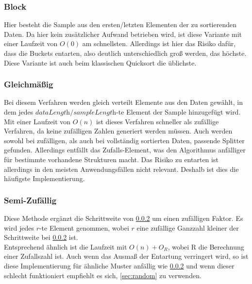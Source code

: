 		\subsubsection{Block}
			\label{sec:block}
			
			Hier besteht die Sample aus den ersten/letzten Elementen der zu sortierenden Daten.
			Da hier kein zusätzlicher Aufwand betrieben wird, ist diese Variante mit einer Laufzeit von $O(0)$ am schnellsten.
			Allerdings ist hier das Risiko dafür, dass die Buckets entarten, also deutlich unterschiedlich groß werden, das höchste.
			Diese Variante ist auch beim klassischen Quicksort die üblichste.

		\subsubsection{Gleichmäßig}
			\label{sec:even}
			
			Bei diesem Verfahren werden gleich verteilt Elemente aus den Daten gewählt, in dem jedes $\textit{dataLength}/\textit{sampleLength}$-te Element der Sample hinzugefügt wird.\\
			Mit einer Laufzeit von $O(n)$ ist dieses Verfahren schneller als zufällige Verfahren, da keine zufälligen Zahlen generiert werden müssen.
			Auch werden sowohl bei zufälligen, als auch bei vollständig sortierten Daten, passende Splitter gefunden.
			Allerdings entfällt das Zufalls-Element, was den Algorithmus anfälliger für bestimmte vorhandene Strukturen macht.
			Das Risiko zu entarten ist allerdings in den meisten Anwendungsfällen nicht relevant.
			Deshalb ist dies die häufigste Implementierung.

		\subsubsection{Semi-Zufällig}
			\label{sec:semi-random}
			
			Diese Methode ergänzt die Schrittweite von \ref{sec:even} um einen zufälligen Faktor.
			Es wird jedes $r$-te Element genommen, wobei $r$ eine zufällige Ganzzahl kleiner der Schrittweite bei \ref{sec:even} ist.\\
			Entsprechend ähnlich ist die Laufzeit mit $O(n)+O_R$, wobei R die Berechnung einer Zufallszahl ist.
			Auch wenn das Ausmaß der Entartung verringert wird, so ist diese Implementierung für ähnliche Muster anfällig wie \ref{sec:even} und wenn dieser schlecht funktioniert empfiehlt es sich, \ref{sec:random} zu verwenden.

